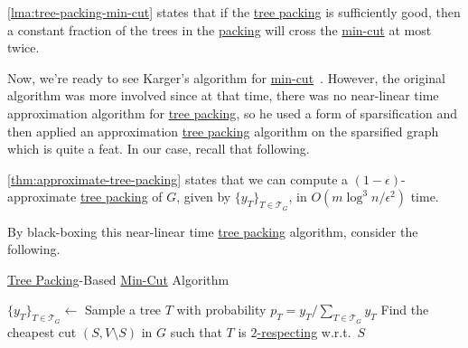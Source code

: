 \begin{remark}
	\autoref{lma:tree-packing-min-cut} states that if the \hyperref[prb:tree-packing]{tree packing} is sufficiently good, then a constant fraction of the trees in the \hyperref[prb:tree-packing]{packing} will cross the \hyperref[prb:global-min-cut]{min-cut} at most twice.
\end{remark}

Now, we're ready to see Karger's algorithm for \hyperref[prb:global-min-cut]{min-cut}~\cite{karger2000minimum}. However, the original algorithm was more involved since at that time, there was no near-linear time approximation algorithm for \hyperref[prb:tree-packing]{tree packing}, so he used a form of sparsification and then applied an approximation \hyperref[prb:tree-packing]{tree packing} algorithm on the sparsified graph which is quite a feat. In our case, recall that following.

\begin{prev}
	\autoref{thm:approximate-tree-packing} states that we can compute a \((1 - \epsilon )\)-approximate \hyperref[prb:tree-packing]{tree packing} of \(G\), given by \(\{ y_T \} _{T \in \mathcal{T} _G}\), in \(O(m \log ^3 n / \epsilon ^2)\) time.
\end{prev}

By black-boxing this near-linear time \hyperref[prb:tree-packing]{tree packing} algorithm, consider the following.

\begin{algorithm}[H]\label{algo:Karger-tree-packing-based-min-cut}
	\DontPrintSemicolon{}
	\caption{\hyperref[prb:tree-packing]{Tree Packing}-Based \hyperref[prb:global-min-cut]{Min-Cut} Algorithm~\cite{karger2000minimum,chekuri2017near}}
	\BlankLine

	\(\{ y_T \} _{T \in \mathcal{T} _G} \gets\)\label{algo:Karger-tree-packing-based-min-cut-tree-packing}
	Sample a tree \(T\) with probability \(p_T = y_T / \sum_{T \in \mathcal{T} _G} y_T\)\label{algo:Karger-tree-packing-based-min-cut-sample}\;
	Find the cheapest cut \((S, V\setminus S)\) in \(G\) such that \(T\) is \hyperref[def:respect]{\(2\)-respecting} w.r.t.\ \(S\)\label{algo:Karger-tree-packing-based-min-cut-find-respect-cut}\;
	\;
\end{algorithm}

